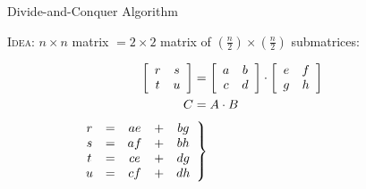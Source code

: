 \documentclass{beamer}
\begin{document}
\begin{frame}[fragile]{Divide-and-Conquer Algorithm}
    \begin{alertblock}{\textsc{Idea:}}
        $n \times n$ matrix $= 2 \times 2$ matrix of $\left(\frac{n}{2}\right) \times \left(\frac{n}{2}\right)$ submatrices:
    \end{alertblock}
    \begin{equation*}
        \begin{split}
            \left[
                \begin{array}{c c}
                    r & s \\
                    t & u
                \end{array}
            \right]
            &=
            \left[
                \begin{array}{c c}
                    a & b \\
                    c & d
                \end{array}
            \right]
            \cdot
            \left[
                \begin{array}{c c}
                    e & f \\
                    g & h
                \end{array}
            \right] \\
            C &= A \cdot B
        \end{split}
    \end{equation*}
    \begin{align*}
        \left.
            \begin{array}{c c c c c}
                r & = & ae & + & bg \\
                s & = & af & + & bh \\
                t & = & ce & + & dg \\
                u & = & cf & + & dh \\
            \end{array}
        \right\} \text{\hspace{50mm}}
    \end{align*}
    \pause
\end{frame}
\end{document}
